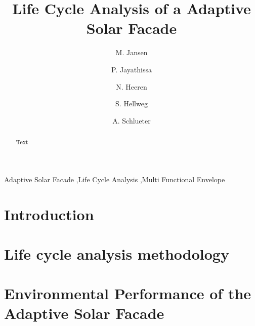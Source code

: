 \documentclass[preprint,12pt]{elsarticle}
\begin{document}
\begin{frontmatter}

\title{Life Cycle Analysis of a Adaptive Solar Facade} 

\author[ita]{M. Jansen}

\author[ita]{P. Jayathissa}

\author[baug]{N. Heeren}

\author[baug]{S. Hellweg}

\author[ita]{A. Schlueter}



\address[ita]{Architecture and Building Systems, Institute of Technology in Architecture,\\ ETH Zurich, Switzerland} 
\address[baug]{Ecological System Design, Institute of Environmental Engineering,\\ ETH Zurich, Switzerland}

\begin{abstract}
Text 
\end{abstract}

\begin{keyword}
Adaptive Solar Facade \sep Life Cycle Analysis \sep Multi Functional Envelope
\end{keyword}

\end{frontmatter}

\section{Introduction}
\label{ch:introduction}


\section{Life cycle analysis methodology}
\label{ch:method}


\section{Environmental Performance of the Adaptive Solar Facade}
\label{ch:profile}

\end{document}
